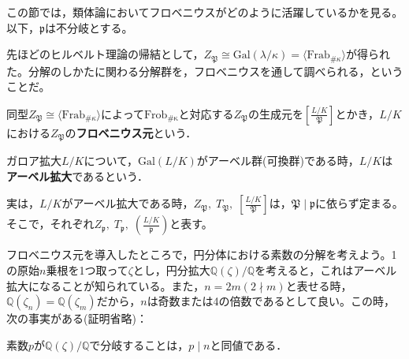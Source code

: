 この節では，類体論においてフロベニウスがどのように活躍しているかを見る。以下，$\mathfrak{p}$は不分岐とする。

先ほどのヒルベルト理論の帰結として，$Z_{\mathfrak{P}}\cong\mathrm{Gal}(\lambda/\kappa)=\langle\mathrm{Frab}_{\#\kappa}\rangle$が得られた。分解のしかたに関わる分解群を，フロベニウスを通して調べられる，ということだ。
\begin{dfn}[フロベニウス元]
    同型$Z_{\mathfrak{P}}\cong\langle\mathrm{Frab}_{\#\kappa}\rangle$によって$\mathrm{Frob_{\#\kappa}}$と対応する$Z_{\mathfrak{P}}$の生成元を$\left[\frac{L/K}{\mathfrak{P}}\right]$とかき，$L/K$における$Z_{\mathfrak{P}}$の\textbf{フロベニウス元}という．
\end{dfn}
\begin{dfn}[アーベル拡大]
    ガロア拡大$L/K$について，$\mathrm{Gal}(L/K)$がアーベル群(可換群)である時，$L/K$は\textbf{アーベル拡大}であるという．
\end{dfn}
実は，$L/K$がアーベル拡大である時，$Z_{\mathfrak{P}},\; T_{\mathfrak{P}},\; \left[\frac{L/K}{\mathfrak{P}}\right]$は，$\mathfrak{P}\mid\mathfrak{p}$に依らず定まる。そこで，それぞれ$Z_{\mathfrak{p}},\; T_{\mathfrak{p}},\; \left(\frac{L/K}{\mathfrak{p}}\right)$と表す。

フロベニウス元を導入したところで，円分体における素数の分解を考えよう。1の原始$n$乗根を1つ取って$\zeta$とし，円分拡大$\mathbb{Q}(\zeta)/\mathbb{Q}$を考えると，これはアーベル拡大になることが知られている。また，$n=2m\left(2\nmid m\right)$と表せる時，$\mathbb{Q}(\zeta_n)=\mathbb{Q}(\zeta_m)$だから，$n$は奇数または4の倍数であるとして良い。この時，次の事実がある(証明省略)：
\begin{prop}
    素数$p$が$\mathbb{Q}(\zeta)/\mathbb{Q}$で分岐することは，$p\mid n$と同値である．
\end{prop}

